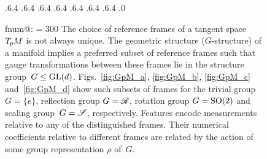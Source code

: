\begin{figure}
    \vspace*{\dimexpr-\parskip-66.pt\relax}%
        .6\textwidth .4\textwidth %
        .6\textwidth .4\textwidth
        .6\textwidth .4\textwidth
        .6\textwidth .4\textwidth
        .6\textwidth .4\textwidth
        .6\textwidth .4\textwidth
        .6\textwidth .4\textwidth
        .0\textwidth %
    \makeatletter
        {\protect{}}%
    \small %
    \csname fnum@\@captype\endcsname: %
    \makeatother
    \hyphenpenalty = 300 %
        The choice of reference frames of a tangent space $T_{\mkern-1.5mu p}\mkern-.5muM$ is not always unique.
        The geometric structure ($G$-structure) of a manifold implies a preferred subset of reference frames such that gauge transformations between these frames lie in the structure group~$G\leq\operatorname{GL}(d)$.
        Figs.~\ref{fig:GpM_a}, \ref{fig:GpM_b}, \ref{fig:GpM_c} and~\ref{fig:GpM_d}
        show such subsets of frames for the trivial group $G=\{e\}$, reflection group $G=\mathscr{R}$, rotation group $G=\operatorname{SO}(2)$ and scaling group~$G=\mathscr{S}$, respectively.
        Features encode measurements relative to any of the distinguished frames.
        Their numerical coefficients relative to different frames are related by the action of some group representation $\rho$ of~$G$.
    \label{fig:GpM_examples}
\end{figure}



